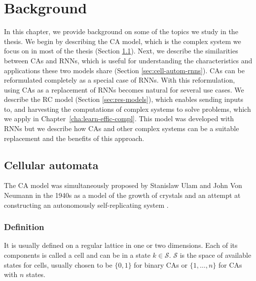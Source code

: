 \chapter{Background}
\label{cha:background}

In this chapter, we provide background on some of the topics we study in the
thesis. We begin by describing the \acf{CA} model, which is the complex system
we focus on in most of the thesis (Section \ref{sec:cellular-automata-sec}).
Next, we describe the similarities between \acp{CA} and \acfp{RNN}, which is
useful for understanding the characteristics and applications these two models
share (Section \ref{sec:cell-autom-rnns}). \acp{CA} can be reformulated
completely as a special case of \acp{RNN}. With this reformulation, using
\acp{CA} as a replacement of \acp{RNN} becomes natural for several use cases. We
describe the \acf{RC} model (Section \ref{sec:res-models}), which enables
sending inputs to, and harvesting the computations of complex systems to solve
problems, which we apply in Chapter~\ref{cha:learn-effic-compl}. This model was
developed with \acp{RNN} but we describe how \acp{CA} and other complex systems
can be a suitable replacement and the benefits of this approach.

\section{Cellular automata}\label{sec:cellular-automata-sec}

The \acf{CA} model was simultaneously proposed by Stanislaw Ulam and John Von
Neumann in the 1940s as a model of the growth of crystals and an attempt at
constructing an autonomously self-replicating system
\parencite{vonneumannTheorySelfreproducingAutomata1966}.

\subsection{Definition}\label{sec:definition}
It is usually defined on a regular lattice in one or two dimensions. Each of its
components is called a cell and can be in a state $k \in \mathcal{S}$. $\mathcal{S}$ is the space of
available states for cells, usually chosen to be $\{0, 1\}$ for binary
\acp{CA} or $\{1, \ldots, n\}$ for \acp{CA} with $n$ states.

